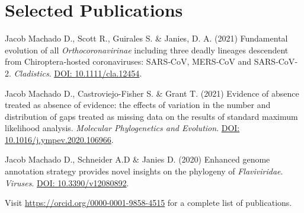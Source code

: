 
\section{Selected Publications}

	{
		\setlength{\parskip}{.2em}\renewcommand{\baselinestretch}{2.0}
		\begin{hangparas}{.25in}{1}
        
        Jacob Machado D., Scott R., Guirales S. \& Janies, D. A. (2021) Fundamental evolution of all \emph{Orthocoronavirinae} including three deadly lineages descendent from Chiroptera‐hosted coronaviruses: SARS‐CoV, MERS‐CoV and SARS‐CoV‐2. \emph{Cladistics}. \href{https://doi.org/10.1111/cla.12454}{DOI: 10.1111/cla.12454}.
    
        Jacob Machado D., Castroviejo-Fisher S. \& Grant T. (2021) Evidence of absence treated as absence of evidence: the effects of variation in the number and distribution of gaps treated as missing data on the results of standard maximum likelihood analysis. \emph{Molecular Phylogenetics and Evolution}. \href{https://doi.org/10.1016/j.ympev.2020.106966}{DOI: 10.1016/j.ympev.2020.106966}.
    
        Jacob Machado D., Schneider A.D \& Janies D. (2020) Enhanced genome annotation strategy provides novel insights on the phylogeny of \emph{Flaviviridae}. \emph{Viruses}. \href{https://www.mdpi.com/1999-4915/12/8/892}{DOI: 10.3390/v12080892}.

		\end{hangparas}
	}
    
    \vspace{1em}
    
    {\color{MyLightBlue} Visit \href{https://orcid.org/0000-0001-9858-4515}{https://orcid.org/0000-0001-9858-4515} for a complete list of publications.\\}